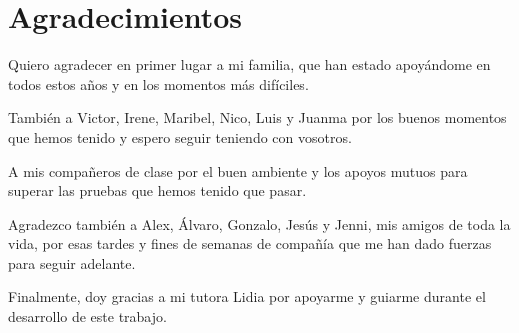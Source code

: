 \chapter*{Agradecimientos}

Quiero agradecer en primer lugar a mi familia, que han estado apoyándome en todos estos años y en los momentos más difíciles. 

También a Victor, Irene, Maribel, Nico, Luis y Juanma por los buenos momentos que hemos tenido y espero seguir teniendo con vosotros. 

A mis compañeros de clase por el buen ambiente y los apoyos mutuos para superar las pruebas que hemos tenido que pasar.

Agradezco también a Alex, Álvaro, Gonzalo, Jesús y Jenni, mis amigos de toda la vida, por esas tardes y fines de semanas de compañía que me han dado fuerzas para seguir adelante.

Finalmente, doy gracias a mi tutora Lidia por apoyarme y guiarme durante el desarrollo de este trabajo.
